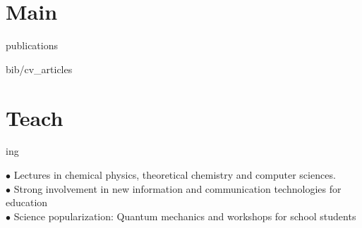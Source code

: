 \documentclass{cv-style}     %
\begin{document}
\vspace{-6mm}
\section{Main}{ publications}
\vspace{-0.2cm}
\nocite{villegas_molecular_2020, sabalot-cuzzubbo_relating_2020, aqturin2017_2, guille2015, Martin2012}
\begin{btSect}{bib/cv_articles}
    \setlength{\bibsep}{2pt}
    \btPrintCited
\end{btSect}


%

\vspace{-1mm}
\section{Teach}{ing}
  \vspace{-0.3cm}

$\bullet$ Lectures in chemical physics, theoretical chemistry and computer sciences.\\
$\bullet$ Strong involvement in new information and communication technologies for education\\
$\bullet$ Science popularization: Quantum mechanics and workshops for school students
\end{document}
